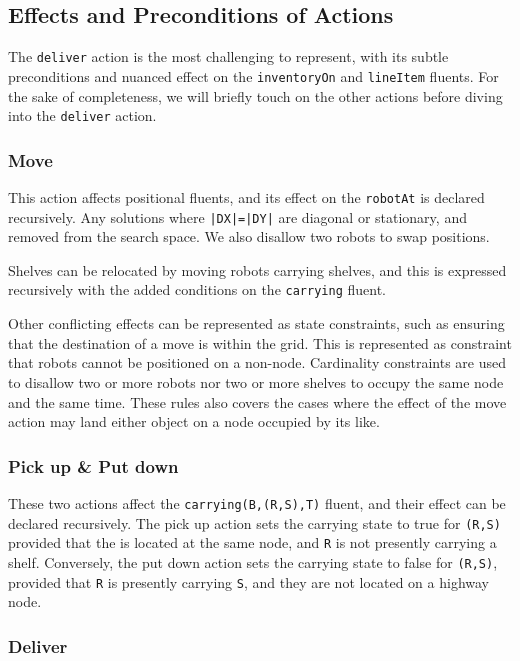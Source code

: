 \documentclass[letterpaper]{article}
\newcommand{\ct}[1]{\texttt{#1}}
\begin{document}
\subsection{Effects and Preconditions of Actions}

The \ct{deliver} action is the most challenging to represent, with its subtle preconditions and nuanced effect on the \ct{inventoryOn} and \ct{lineItem} fluents. For the sake of completeness, we will briefly touch on the other actions before diving into the \ct{deliver} action.

\subsubsection{Move}

This action affects positional fluents, and its effect on the \ct{robotAt} is declared recursively. Any solutions where \ct{|DX|=|DY|} are diagonal or stationary, and removed from the search space. We also disallow two robots to swap positions.

Shelves can be relocated by moving robots carrying shelves, and this is expressed recursively with the added conditions on the \ct{carrying} fluent.

Other conflicting effects can be represented as state constraints, such as ensuring that the destination of a move is within the grid. This is represented as constraint that robots cannot be positioned on a non-node. Cardinality constraints are used to disallow two or more robots nor two or more shelves to occupy the same node and the same time. These rules also covers the cases where the effect of the move action may land either object on a node occupied by its like.

\subsubsection{Pick up \& Put down}

These two actions affect the \ct{carrying(B,(R,S),T)} fluent, and their effect can be declared recursively. The pick up action sets the carrying state to true for \ct{(R,S)} provided that the is located at the same node, and \ct{R} is not presently carrying a shelf. Conversely, the put down action sets the carrying state to false for \ct{(R,S)}, provided that \ct{R} is presently carrying  \ct{S}, and they are not located on a highway node.

\subsubsection{Deliver}
\end{document}

